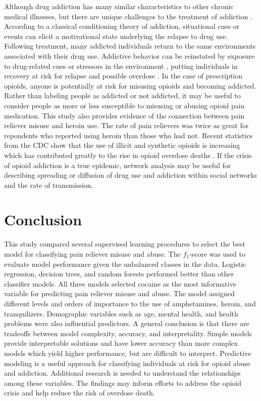 \documentclass[sigconf]{acmart}
\begin{document}
Although drug addiction has many similar characteristics to other chronic 
medical illnesses, but there are unique challenges to the treatment of 
addiction \cite{marsch12, swendson16}. According to a classical conditioning 
theory of addiction, situational cues or events can elicit a motivational 
state underlying the relapse to drug use. Following treatment, many addicted individuals return to the same environments associated with their drug use. 
Addictive behavior can be reinstated by exposure to drug-related cues or 
stressors in the environment \cite{shaham03}, putting individuals in 
recovery at risk for relapse and possible overdose \cite{johnson11}. In the 
case of prescription opioids, anyone is potentially at risk for misusing 
opioids and becoming addicted. Rather than labeling people as addicted or 
not addicted, it may be useful to consider people as more or less susceptible 
to misusing or abusing opioid pain medication. This study also provides 
evidence of the connection between pain reliever misuse and heroin use. The
rate of pain relievers was twice as great for repondents who reported using
heroin than those who had not. Recent statistics from the CDC show that the
use of illicit and synthetic opioids is increasing which has contributed 
greatly to the rise in opioid overdose deaths \cite{cdc18}. If the crisis of 
opioid addiction is a true epidemic, network analysis may be useful for
describing spreading or diffusion of drug use and addiction within social 
networks and the rate of transmission. 

\section{Conclusion}

This study compared several supervised learning procedures to select the best 
model for classifying pain reliever misuse and abuse. The $f_1$-score was used 
to evaluate model performance given the unbalanced classes in the data. 
Logistic regression, decision trees, and random forests performed better than
other classifier models. All three models selected cocaine as the most 
informative variable for predicting pain reliever misuse and abuse. The
model assigned different levels and orders of importance to the use of
amphetamines, heroin, and tranquilizers. Demographic variables such as age, 
mental health, and health problems were also influential predictors. 
A general conclusion is that there are tradeoffs between model complexity, 
accuracy, and interpretality. Simple models provide interpretable solutions 
and have lower accuracy than more complex models which yield higher performance, 
but are difficult to interpret. Predictive modeling is a useful approach 
for classifying individuals at risk for opioid abuse and addiction. Additional 
research is needed to understand the relationships among these variables.
The findings may inform efforts to address the opioid crisis and help 
reduce the risk of overdose death. 
\end{document}
